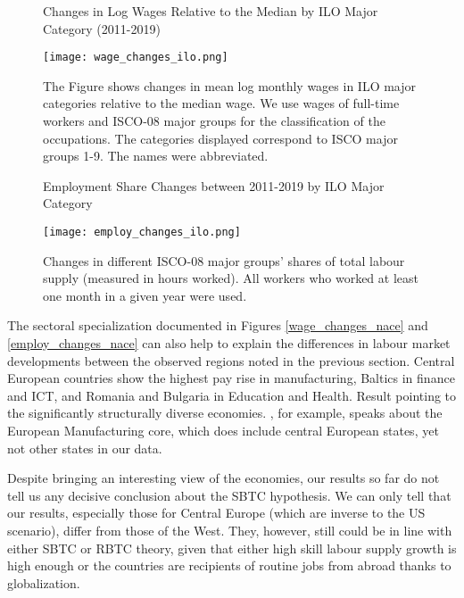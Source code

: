 \documentclass[11pt]{article}
\begin{document}
\begin{figure}[!htbp]%
\centering
    \caption{Changes in Log Wages Relative to the Median by ILO Major Category (2011-2019)}
    {\texttt{[image: wage\_changes\_ilo.png]} }
    \caption*{\footnotesize The Figure shows changes in mean log monthly wages in ILO major categories relative to the median wage. We use wages of full-time workers and ISCO-08 major groups for the classification of the occupations. The categories displayed correspond to ISCO major groups 1-9. The names were abbreviated.}
\label{wage_changes_ilo}
\end{figure}


\begin{figure}[!htbp]%
\centering
    \caption{Employment Share Changes between 2011-2019 by ILO Major Category}
    {\texttt{[image: employ\_changes\_ilo.png]} }
    \caption*{\footnotesize Changes in different ISCO-08 major groups' shares of total labour supply (measured in hours worked). All workers who worked at least one month in a given year were used.}
\label{employ_changes_ilo}
\end{figure}

The sectoral specialization documented in Figures \ref{wage_changes_nace} and \ref{employ_changes_nace} can also help to explain the differences in labour market developments between the observed regions noted in the previous section. Central European countries show the highest pay rise in manufacturing, Baltics in finance and ICT, and Romania and Bulgaria in Education and Health. Result pointing to the significantly structurally diverse economies. \citet{stollinger2016structural}, for example, speaks about the European Manufacturing core, which does include central European states, yet not other states in our data.

Despite bringing an interesting view of the economies, our results so far do not tell us any decisive conclusion about the SBTC hypothesis. We can only tell that our results, especially those for Central Europe (which are inverse to the US scenario), differ from those of the West. They, however, still could be in line with either SBTC or RBTC theory, given that either high skill labour supply growth is high enough or the countries are recipients of routine jobs from abroad thanks to globalization.
\end{document}
